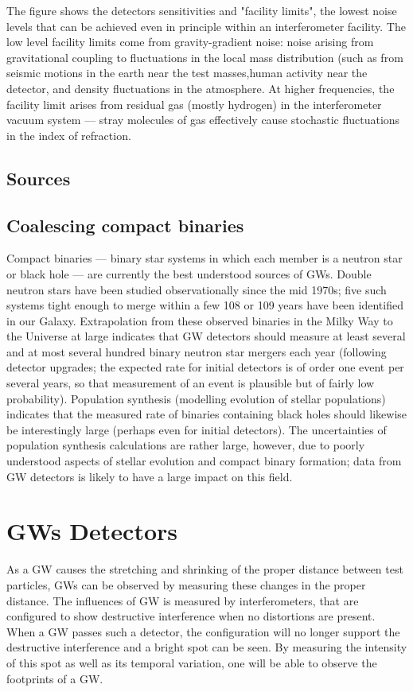\documentclass[binding=0.6cm, LaM]{sapthesis}
\begin{document}
The figure shows the detectors sensitivities and "facility limits", the lowest noise levels that can be achieved even in principle within an interferometer facility. 
The low level facility limits come from gravity-gradient noise: noise arising from gravitational coupling to fluctuations in the local mass distribution (such as from seismic motions in the earth near
 the test masses,human activity near the detector, and density fluctuations in the atmosphere. At higher frequencies, the facility limit arises from residual gas (mostly hydrogen) in the 
interferometer vacuum system — stray molecules of gas effectively cause stochastic fluctuations in the index of refraction.
\subsection{Sources}
\subsection{Coalescing compact binaries}
Compact binaries — binary star systems in which each member is a neutron star or black hole — are currently the best understood sources of GWs.
 Double neutron stars have been studied observationally since the mid 1970s; five such systems tight enough to merge within a few 108 or 109 years have been identified in our Galaxy. 
Extrapolation from these observed binaries in the Milky Way to the Universe at large indicates that GW detectors should measure at least several and at most several hundred binary neutron star mergers
 each year (following detector upgrades; the expected rate for initial detectors is of order one event per several years, so that measurement of an event is plausible but of fairly low probability). 
Population synthesis (modelling evolution of stellar populations) indicates that the measured rate of binaries containing black holes should likewise be interestingly large (perhaps even for initial
 detectors). The uncertainties of population synthesis calculations are rather large, however, due to poorly understood aspects of stellar evolution and compact binary formation;
 data from GW detectors is likely to have a large impact on this field. 
\section{GWs Detectors}
As a GW causes the stretching and shrinking of the proper distance between test particles, GWs can be observed by measuring these changes in the proper distance. 
The influences of GW is measured by interferometers, that are configured to show destructive interference when no distortions are present. 
When a GW passes such a detector, the configuration will no longer support the destructive interference and a bright spot can be seen. 
By measuring the intensity of this spot as well as its temporal variation, one will be able to observe the footprints of a GW. 
\end{document}
